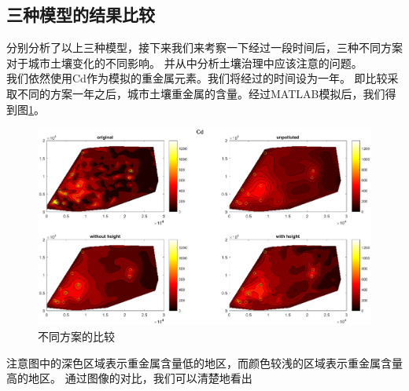 \documentclass[a4paper]{article}
\begin{document}
\subsection{三种模型的结果比较}
分别分析了以上三种模型，接下来我们来考察一下经过一段时间后，三种不同方案对于城市土壤变化的不同影响。
并从中分析土壤治理中应该注意的问题。\\
\indent 我们依然使用Cd作为模拟的重金属元素。我们将经过的时间设为一年。
即比较采取不同的方案一年之后，城市土壤重金属的含量。经过MATLAB模拟后，我们得到图\ref{fig:different-model-comparison-of-Cd}。
\begin{figure}
    \flushleft
    \includegraphics[scale=0.5]{pictures/different-model-comparison-of-Cd.eps}
    \caption{不同方案的比较}
    \label{fig:different-model-comparison-of-Cd}
\end{figure}
注意图中的深色区域表示重金属含量低的地区，而颜色较浅的区域表示重金属含量高的地区。
通过图像的对比，我们可以清楚地看出
\end{document}
